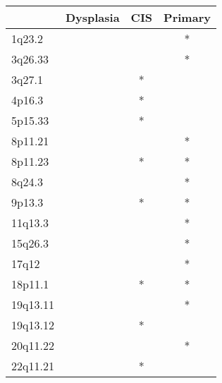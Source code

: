 \begin{tabular}{lccc}
\toprule
{} & Dysplasia & CIS & Primary \\
\midrule
1q23.2   &           &     &       * \\
3q26.33  &           &     &       * \\
3q27.1   &           &   * &         \\
4p16.3   &           &   * &         \\
5p15.33  &           &   * &         \\
8p11.21  &           &     &       * \\
8p11.23  &           &   * &       * \\
8q24.3   &           &     &       * \\
9p13.3   &           &   * &       * \\
11q13.3  &           &     &       * \\
15q26.3  &           &     &       * \\
17q12    &           &     &       * \\
18p11.1  &           &   * &       * \\
19q13.11 &           &     &       * \\
19q13.12 &           &   * &         \\
20q11.22 &           &     &       * \\
22q11.21 &           &   * &         \\
\bottomrule
\end{tabular}
